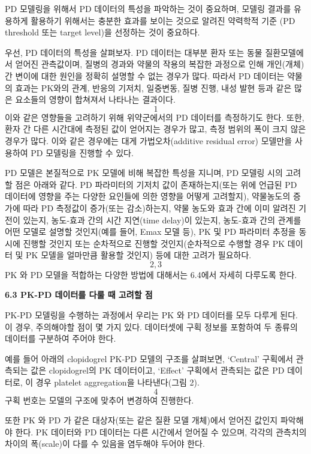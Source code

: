 \documentclass[
  10pt,
]{krantz}
\begin{document}
PD 모델링을 위해서 PD 데이터의 특성을 파악하는 것이 중요하며, 모델링 결과를 유용하게 활용하기 위해서는 충분한 효과를 보이는
것으로 알려진 약력학적 기준 (PD threshold 또는 target level)을 선정하는 것이 중요하다.

우선, PD 데이터의 특성을 살펴보자. PD 데이터는 대부분 환자 또는 동물 질환모델에서 얻어진 관측값이며, 질병의 경과와 약물의
작용의 복잡한 과정으로 인해 개인(개체) 간 변이에 대한 원인을 정확히 설명할 수 없는 경우가 많다. 따라서 PD 데이터는 약물의
효과는 PK와의 관계, 반응의 기저치, 일중변동, 질병 진행, 내성 발현 등과 같은 많은 요소들의 영향이 합쳐져서 나타나는
결과이다. \[1\] 이와 같은 영향들을 고려하기 위해 위약군에서의 PD 데이터를 측정하기도 한다. 또한, 환자 간
다른 시간대에 측정된 값이 얻어지는 경우가 많고, 측정 범위의 폭이 크지 않은 경우가 많다. 이와 같은 경우에는 대게
가법오차(additive residual error) 모델만을 사용하여 PD 모델링을 진행할 수 있다.

PD 모델은 본질적으로 PK 모델에 비해 복잡한 특성을 지니며, PD 모델링 시의 고려할 점은 아래와 같다. PD 파라미터의
기저치 값이 존재하는지(또는 위에 언급된 PD 데이터에 영향을 주는 다양한 요인들에 의한 영향을 어떻게 고려할지),
약물농도의 증가에 따라 PD 측정값이 증가(또는 감소)하는지, 약물 농도와 효과 간에 이미 알려진 기전이 있는지,
농도-효과 간의 시간 지연(time delay)이 있는지, 농도-효과 간의 관계를 어떤 모델로 설명할 것인지(예를
들어, Emax 모델 등), PK 및 PD 파라미터 추정을 동시에 진행할 것인지 또는 순차적으로 진행할 것인지(순차적으로
수행할 경우 PK 데이터 및 PK 모델을 얼마만큼 활용할 것인지) 등에 대한 고려가 필요하다. \[2,3\] PK 와
PD 모델을 적합하는 다양한 방법에 대해서는 6.4에서 자세히 다루도록 한다.

\textbf{6.3 PK-PD 데이터를 다룰 때 고려할 점}

PK-PD 모델링을 수행하는 과정에서 우리는 PK 와 PD 데이터를 모두 다루게 된다. 이 경우, 주의해야할 점이 몇 가지 있다.
데이터셋에 구획 정보를 포함하여 두 종류의 데이터를 구분하여 주어야 한다.

예를 들어 아래의 clopidogrel PK-PD 모델의 구조를 살펴보면, `Central' 구획에서 관측되는 값은
clopidogrel의 PK 데이터이고, `Effect' 구획에서 관측되는 값은 PD 데이터로, 이 경우 platelet
aggregation을 나타낸다(그림 2). \[4\] 구획 번호는 모델의 구조에 맞추어 변경하여 진행한다.

또한 PK 와 PD 가 같은 대상자(또는 같은 질환 모델 개체)에서 얻어진 값인지 파악해야 한다. PK 데이터와 PD 데이터는
다른 시간에서 얻어질 수 있으며, 각각의 관측치의 차이의 폭(scale)이 다를 수 있음을 염두해야 두어야 한다.
\end{document}
